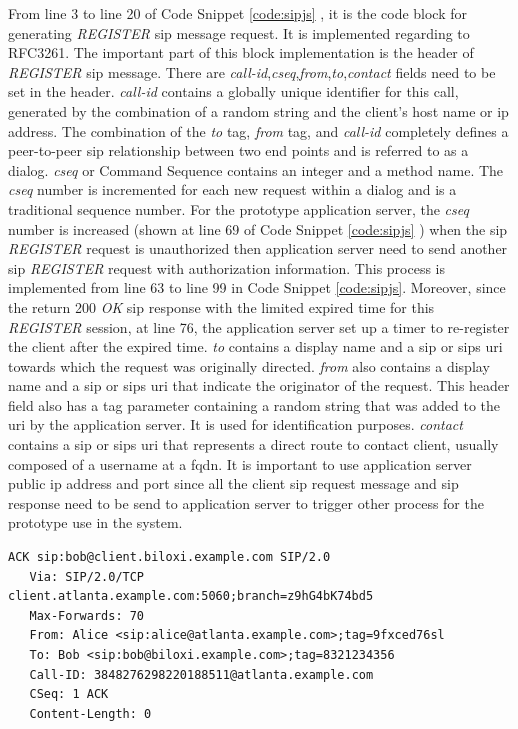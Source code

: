 \par From line 3 to line 20 of Code Snippet \ref{code:sipjs} , it is the code block for generating \textit{REGISTER} \gls{sip} message request. It is implemented regarding to RFC3261. The important part of this block implementation is the header of \textit{REGISTER} \gls{sip} message. There are \textit{call-id},\textit{cseq},\textit{from},\textit{to},\textit{contact} fields need to be set in the header. \textit{call-id} contains a globally unique identifier for this call, generated by the combination of a random string and the client's host name or \gls{ip} address. The combination of the \textit{to} tag, \textit{from} tag, and \textit{call-id} completely defines a peer-to-peer \gls{sip} relationship between two end points and is referred to as a dialog. \textit{cseq} or Command Sequence contains an integer and a method name. The \textit{cseq} number is incremented for each new request within a dialog and is a traditional sequence number. For the prototype application server, the \textit{cseq} number is increased (shown at line 69 of Code Snippet \ref{code:sipjs} ) when the \gls{sip} \textit{REGISTER} request is unauthorized then application server need to send another \gls{sip} \textit{REGISTER} request with authorization information. This process is implemented from line 63 to line 99 in Code Snippet \ref{code:sipjs}. Moreover, since the return 200 \textit{OK} \gls{sip} response with the limited expired time for this \textit{REGISTER} session, at line 76, the application server set up a timer to re-register the client after the expired time. \textit{to} contains a display name and a \gls{sip} or \gls{sip}s \gls{uri} towards which the request was originally directed. \textit{from} also contains a display name and a \gls{sip} or \gls{sip}s \gls{uri} that indicate the originator of the request. This header field also has a tag parameter containing a random string that was added to the \gls{uri} by the application server. It is used for identification purposes. \textit{contact} contains a \gls{sip} or \gls{sip}s \gls{uri} that represents a direct route to contact client, usually composed of a username at a \gls{fqdn}. It is important to use application server public \gls{ip} address and port since all the client \gls{sip} request message and \gls{sip} response need to be send to application server to trigger other process for the prototype use in the system.

\begin{lstlisting}[caption={ACK Alice -> Bob Sample \cite{rfc:3665}},label={code:ack_sample}]
   ACK sip:bob@client.biloxi.example.com SIP/2.0
   Via: SIP/2.0/TCP client.atlanta.example.com:5060;branch=z9hG4bK74bd5
   Max-Forwards: 70
   From: Alice <sip:alice@atlanta.example.com>;tag=9fxced76sl
   To: Bob <sip:bob@biloxi.example.com>;tag=8321234356
   Call-ID: 3848276298220188511@atlanta.example.com
   CSeq: 1 ACK
   Content-Length: 0
\end{lstlisting}

